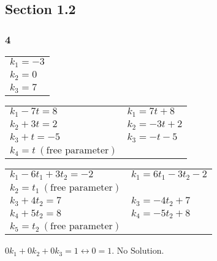 \subsection*{Section 1.2}
\subsubsection*{4}
\begin{enumerate}
  \begin{tabular}{l}
    $k_1 = -3$ \\
    $k_2 = 0$  \\
    $k_3 = 7$
  \end{tabular}
  \begin{tabular}{ll}
    $k_1 - 7t = 8$ & $k_1 = 7t + 8$   \\
    $k_2 + 3t = 2$ & $k_2 = -3t + 2$  \\
    $k_3 + t = -5$ & $k_3 = -t -5$    \\
    $k_4 = t~(\text{free parameter})$ \\
  \end{tabular}
  \begin{tabular}{ll}
    $k_1 - 6t_1 + 3t_2 = -2$ & $k_1 = 6t_1 - 3t_2 - 2$ \\
    $k_2 = t_1~(\text{free parameter})$                \\
    $k_3 + 4t_2 = 7$         & $k_3 = -4t_2 + 7$       \\
    $k_4 + 5t_2 = 8$         & $k_4 = -5t_2 + 8$       \\
    $k_5 = t_2~(\text{free parameter})$                \\
  \end{tabular}
  $0k_1 + 0k_2 + 0k_3 = 1 \leftrightarrow 0 = 1$. No Solution.
\end{enumerate}

